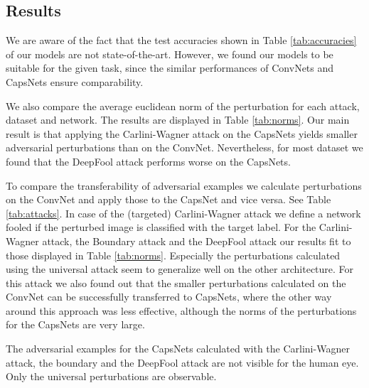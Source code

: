 \documentclass{article}
\begin{document}
\subsection{Results}

We are aware of the fact that the test accuracies shown in Table \ref{tab:accuracies} of our models are not state-of-the-art. However, we found our models to be suitable for the given task, since the similar performances of ConvNets and CapsNets ensure comparability. 
\begin{table}[h]
	\caption{Test accuracies achieved by our networks.}
	\vskip 0.15in
	\centering{}
	\label{tab:accuracies}
\end{table}


We also compare the average euclidean norm of the perturbation for each attack, dataset and network. The results are displayed in Table \ref{tab:norms}. Our main result is that applying the Carlini-Wagner attack on the CapsNets yields smaller adversarial perturbations than on the ConvNet. Nevertheless, for most dataset we found that the DeepFool attack performs worse on the CapsNets.

To compare the transferability of adversarial examples we calculate perturbations on the ConvNet and apply those to the CapsNet and vice versa. See Table \ref{tab:attacks}. In case of the (targeted) Carlini-Wagner attack we define a network fooled if the perturbed image is classified with the target label. For the Carlini-Wagner attack, the Boundary attack and the DeepFool attack our results fit to those displayed in Table \ref{tab:norms}. Especially the perturbations calculated using the universal attack seem to generalize well on the other architecture. For this attack we also found out that the smaller perturbations calculated on the ConvNet can be successfully transferred to CapsNets, where the other way around this approach was less effective, although the norms of the perturbations for the CapsNets are very large.

The adversarial examples for the CapsNets calculated with the Carlini-Wagner attack, the boundary and the DeepFool attack are not visible for the human eye. Only the universal perturbations are observable.
\end{document}
